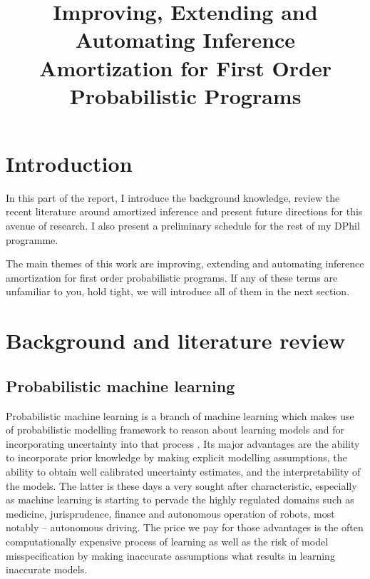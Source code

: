 \documentclass[12pt]{article}
\begin{document}




\title{Improving, Extending and Automating Inference Amortization for First Order Probabilistic Programs}
\date{}
\maketitle

\vspace{-50pt}

\section{Introduction}

In this part of the report, I introduce the background knowledge, review the recent literature around amortized inference and present future directions for this avenue of research. 
I also present a preliminary schedule for the rest of my DPhil programme.

The main themes of this work are improving, extending and automating inference amortization for first order probabilistic programs.
If any of these terms are unfamiliar to you, hold tight, we will introduce all of them in the next section.


\section{Background and literature review}

\subsection{Probabilistic machine learning}
Probabilistic machine learning is a branch of machine learning which makes use of probabilistic modelling framework to reason about learning models and for incorporating uncertainty into that process \citep{Ghahramani2015}.
Its major advantages are the ability to incorporate prior knowledge by making explicit modelling assumptions, the ability to obtain well calibrated uncertainty estimates, and the interpretability of the models.
The latter is these days a very sought after characteristic, especially as machine learning is starting to pervade the highly regulated domains such as medicine, jurisprudence, finance and autonomous operation of robots, most notably -- autonomous driving.
The price we pay for those advantages is the often computationally expensive process of learning as well as the risk of model misspecification by making inaccurate assumptions what results in learning inaccurate models.
\end{document}
